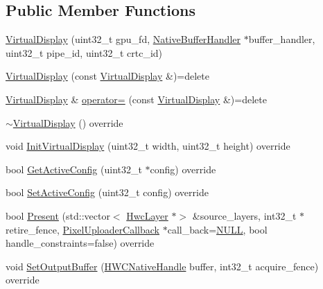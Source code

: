 \subsection*{Public Member Functions}
\begin{DoxyCompactItemize}
\item 
\mbox{\hyperlink{classhwcomposer_1_1VirtualDisplay_a2759b53ddb478ce683047ac616c8c5c7}{Virtual\+Display}} (uint32\+\_\+t gpu\+\_\+fd, \mbox{\hyperlink{classhwcomposer_1_1NativeBufferHandler}{Native\+Buffer\+Handler}} $\ast$buffer\+\_\+handler, uint32\+\_\+t pipe\+\_\+id, uint32\+\_\+t crtc\+\_\+id)
\item 
\mbox{\hyperlink{classhwcomposer_1_1VirtualDisplay_aaec2188fd92ae61e9fcf96516ed93568}{Virtual\+Display}} (const \mbox{\hyperlink{classhwcomposer_1_1VirtualDisplay}{Virtual\+Display}} \&)=delete
\item 
\mbox{\hyperlink{classhwcomposer_1_1VirtualDisplay}{Virtual\+Display}} \& \mbox{\hyperlink{classhwcomposer_1_1VirtualDisplay_a91b8eb8d9a3339e4623e9147b26a3f2d}{operator=}} (const \mbox{\hyperlink{classhwcomposer_1_1VirtualDisplay}{Virtual\+Display}} \&)=delete
\item 
\mbox{\hyperlink{classhwcomposer_1_1VirtualDisplay_afa01fd5c8820b86489bab16b0dfe4eef}{$\sim$\+Virtual\+Display}} () override
\item 
void \mbox{\hyperlink{classhwcomposer_1_1VirtualDisplay_ad0bde041f8a66ab112818ded26e650ad}{Init\+Virtual\+Display}} (uint32\+\_\+t width, uint32\+\_\+t height) override
\item 
bool \mbox{\hyperlink{classhwcomposer_1_1VirtualDisplay_aec4f2f29aebee6947f69920ec832a655}{Get\+Active\+Config}} (uint32\+\_\+t $\ast$config) override
\item 
bool \mbox{\hyperlink{classhwcomposer_1_1VirtualDisplay_ae8a48c2d2449d3185b1653074e74e171}{Set\+Active\+Config}} (uint32\+\_\+t config) override
\item 
bool \mbox{\hyperlink{classhwcomposer_1_1VirtualDisplay_ae97c6838a094e32117b496445e0a8c3e}{Present}} (std\+::vector$<$ \mbox{\hyperlink{structhwcomposer_1_1HwcLayer}{Hwc\+Layer}} $\ast$$>$ \&source\+\_\+layers, int32\+\_\+t $\ast$retire\+\_\+fence, \mbox{\hyperlink{classhwcomposer_1_1PixelUploaderCallback}{Pixel\+Uploader\+Callback}} $\ast$call\+\_\+back=\mbox{\hyperlink{alios_2platformdefines_8h_a070d2ce7b6bb7e5c05602aa8c308d0c4}{N\+U\+LL}}, bool handle\+\_\+constraints=false) override
\item 
void \mbox{\hyperlink{classhwcomposer_1_1VirtualDisplay_a392b98e9fbb3ee437212e10b0874512f}{Set\+Output\+Buffer}} (\mbox{\hyperlink{alios_2platformdefines_8h_ac0a2eaf260f556d17fe489911f017bdf}{H\+W\+C\+Native\+Handle}} buffer, int32\+\_\+t acquire\+\_\+fence) override
$$
\end{DoxyCompactItemize}
